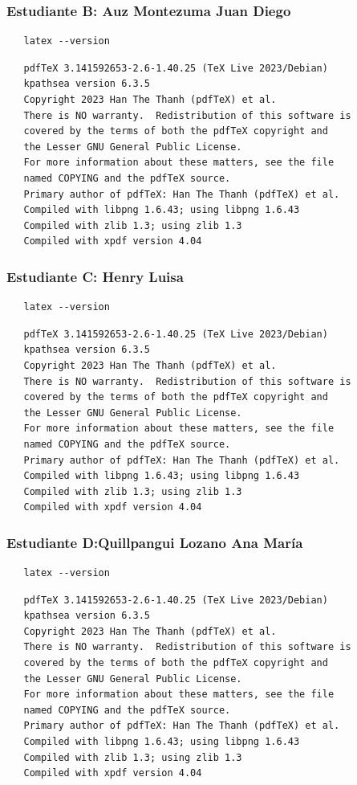 \documentclass{article}
\begin{document}
\subsubsection{Estudiante B: Auz Montezuma Juan Diego}
\label{sec:orga8967f2}
\begin{verbatim}
   latex --version
\end{verbatim}
\begin{verbatim}
   pdfTeX 3.141592653-2.6-1.40.25 (TeX Live 2023/Debian)
   kpathsea version 6.3.5
   Copyright 2023 Han The Thanh (pdfTeX) et al.
   There is NO warranty.  Redistribution of this software is
   covered by the terms of both the pdfTeX copyright and
   the Lesser GNU General Public License.
   For more information about these matters, see the file
   named COPYING and the pdfTeX source.
   Primary author of pdfTeX: Han The Thanh (pdfTeX) et al.
   Compiled with libpng 1.6.43; using libpng 1.6.43
   Compiled with zlib 1.3; using zlib 1.3
   Compiled with xpdf version 4.04
\end{verbatim}
\subsubsection{Estudiante C: Henry Luisa}
\label{sec:orgd2f0e46}
\begin{verbatim}
   latex --version
\end{verbatim}
\begin{verbatim}
   pdfTeX 3.141592653-2.6-1.40.25 (TeX Live 2023/Debian)
   kpathsea version 6.3.5
   Copyright 2023 Han The Thanh (pdfTeX) et al.
   There is NO warranty.  Redistribution of this software is
   covered by the terms of both the pdfTeX copyright and
   the Lesser GNU General Public License.
   For more information about these matters, see the file
   named COPYING and the pdfTeX source.
   Primary author of pdfTeX: Han The Thanh (pdfTeX) et al.
   Compiled with libpng 1.6.43; using libpng 1.6.43
   Compiled with zlib 1.3; using zlib 1.3
   Compiled with xpdf version 4.04
\end{verbatim}
\subsubsection{Estudiante D:Quillpangui Lozano Ana María}
\label{sec:orgad3dc29}
\begin{verbatim}
   latex --version
\end{verbatim}
\begin{verbatim}
   pdfTeX 3.141592653-2.6-1.40.25 (TeX Live 2023/Debian)
   kpathsea version 6.3.5
   Copyright 2023 Han The Thanh (pdfTeX) et al.
   There is NO warranty.  Redistribution of this software is
   covered by the terms of both the pdfTeX copyright and
   the Lesser GNU General Public License.
   For more information about these matters, see the file
   named COPYING and the pdfTeX source.
   Primary author of pdfTeX: Han The Thanh (pdfTeX) et al.
   Compiled with libpng 1.6.43; using libpng 1.6.43
   Compiled with zlib 1.3; using zlib 1.3
   Compiled with xpdf version 4.04
\end{verbatim}
\end{document}
